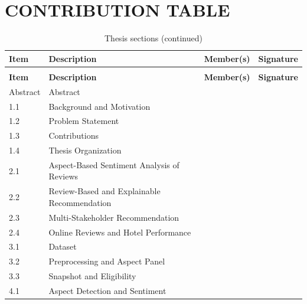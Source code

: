 \chapter*{CONTRIBUTION TABLE}
{}

\newcommand{\rowstrut}{\rule[-0.32cm]{0pt}{0.9cm}}
\newcommand{\handbox}{\fbox{\rule[-0.32cm]{0pt}{0.9cm}\hspace{2.35cm}}}

\begingroup
\renewcommand{\ttdefault}{lmtt} %
\setlength{\tabcolsep}{3.5pt}
\begin{longtable}{@{}p{3.5cm}p{6.15cm}p{3.15cm}p{3.15cm}@{}}
\caption{Thesis sections}\\
\toprule
\textbf{Item} & \textbf{Description} & \textbf{Member(s)} & \textbf{Signature} \\
\midrule
\endfirsthead
\caption[]{Thesis sections (continued)}\\
\toprule
\textbf{Item} & \textbf{Description} & \textbf{Member(s)} & \textbf{Signature} \\
\midrule
\endhead
\midrule
\endfoot
\bottomrule
\endlastfoot
Abstract\rowstrut & Abstract & \handbox & \handbox \\
1.1 & Background and Motivation & \handbox & \handbox \\
1.2 & Problem Statement & \handbox & \handbox \\
1.3 & Contributions & \handbox & \handbox \\
1.4 & Thesis Organization & \handbox & \handbox \\
2.1 & Aspect-Based Sentiment Analysis of Reviews & \handbox & \handbox \\
2.2 & Review-Based and Explainable Recommendation & \handbox & \handbox \\
2.3 & Multi-Stakeholder Recommendation & \handbox & \handbox \\
2.4 & Online Reviews and Hotel Performance & \handbox & \handbox \\
3.1 & Dataset & \handbox & \handbox \\
3.2 & Preprocessing and Aspect Panel & \handbox & \handbox \\
3.3 & Snapshot and Eligibility & \handbox & \handbox \\
4.1 & Aspect Detection and Sentiment & \handbox & \handbox \\

\end{longtable}
